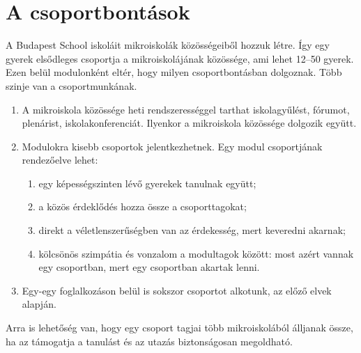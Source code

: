 \section{A csoportbontások}
\label{sec:csoportok}

A Budapest School iskoláit mikroiskolák közösségeiből hozzuk létre. Így egy gyerek elsődleges csoportja a mikroiskolájának közössége, ami lehet 12--50 gyerek. Ezen belül modulonként eltér, hogy milyen csoportbontásban dolgoznak. Több szinje van a csoportmunkának.
\begin{enumerate}
      \item A mikroiskola közössége heti rendszerességgel tarthat iskolagyűlést, fórumot, plenárist, iskolakonferenciát. Ilyenkor a mikroiskola közössége dolgozik együtt.
      \item  Modulokra kisebb csoportok jelentkezhetnek. Egy modul csoportjának rendezőelve lehet:
            \begin{enumerate}
                  \item egy képességszinten lévő gyerekek tanulnak együtt;
                  \item a közös érdeklődés hozza össze a csoporttagokat;
                  \item  direkt a véletlenszerűségben van az érdekesség, mert keveredni akarnak;
                  \item kölcsönös szimpátia és vonzalom a modultagok között: most azért vannak egy csoportban, mert egy csoportban akartak lenni.
            \end{enumerate}
      \item  Egy-egy foglalkozáson belül is sokszor csoportot alkotunk, az előző elvek alapján.

\end{enumerate}

Arra is lehetőség van, hogy egy csoport tagjai több mikroiskolából álljanak össze, ha az támogatja a tanulást és az utazás biztonságosan megoldható.